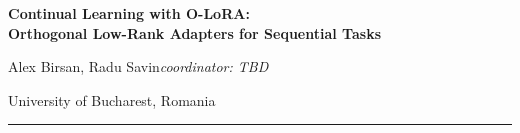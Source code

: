 \documentclass[portrait,a0,final]{a0poster}
\begin{document}
\thispagestyle{empty}

\noindent
\begin{minipage}[c]{0.78\linewidth}
  {\fontsize{72}{82}\selectfont\bfseries Continual Learning with O-LoRA:\\[0.15em]
   Orthogonal Low-Rank Adapters for Sequential Tasks\par}
  \vspace{0.7cm}
  {\Large Alex Birsan, Radu Savin\quad\textit{coordinator: TBD}\par}
  \vspace{0.25cm}
  {\large University of Bucharest, Romania\par}
\end{minipage}\hfill
\begin{minipage}[c]{0.20\linewidth}
  \begin{flushright}
  \end{flushright}
\end{minipage}

\vspace{0.6cm}
{\color{accent}\rule{\linewidth}{3pt}}
\vspace{0.4cm}
\end{document}
